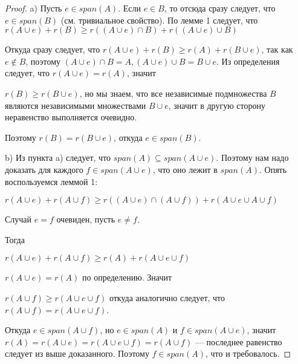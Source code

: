 \begin{proof}
  a) Пусть $e \in span(A)$. Если $e \in B$, то отсюда сразу следует, что $e \in
  span(B)$ (см. тривиальное свойство). По лемме 1 следует, что
  $r(A \cup e) + r(B) \geqslant r((A \cup e) \cap B) + r((A \cup e) \cup B)$

  Откуда сразу следует, что
  $r(A \cup e) + r(B) \geqslant r(A) + r(B \cup e)$, так как $e \not\in B$, поэтому
  $(A \cup e) \cap B = A, (A \cup e) \cup B = B \cup e$. Из определения следует,
  что $r(A \cup e) = r(A)$, значит

  $r(B) \geqslant r(B \cup e)$, но мы знаем, что все независимые подмножества $B$
  являются независимыми множествами $B \cup e$, значит в другую сторону
  неравенство выполняется очевидно.

  Поэтому $r(B) = r(B \cup e)$, откуда $e \in span(B)$.

  b) Из пункта a) следует, что $span(A) \subseteq span(A \cup e)$. Поэтому нам
  надо доказать для каждого $f \in span(A \cup e)$, что оно лежит в $span(A)$.
  Опять воспользуемся леммой 1:

  $r(A \cup e) + r(A \cup f) \geqslant r((A \cup e) \cap (A \cup f)) + r(A \cup e \cup A \cup f)$

  Случай $e = f$ очевиден, пусть $e \neq f$.

  Тогда

  $r(A \cup e) + r(A \cup f) \geqslant r(A) + r(A \cup e \cup f)$

  $r(A \cup e) = r(A)$ по определению. Значит

  $r(A \cup f) \geqslant r(A \cup e \cup f)$ откуда аналогично следует, что
  $r(A \cup f) = r(A \cup e \cup f)$.

  Откуда $e \in span(A \cup f)$, но $e \in span(A)$ и $f \in span(A \cup e)$, значит
  $r(A) = r(A \cup e) = r(A \cup e \cup f) = r(A \cup f)$ --- последнее
  равенство следует из выше доказанного. Поэтому $f \in span(A)$, что и требовалось.
\end{proof}


